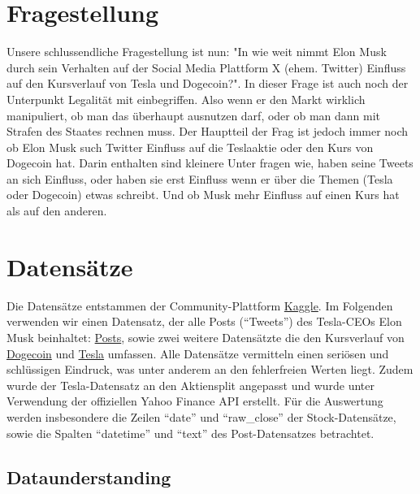 \documentclass{article}
\begin{document}
\section{Fragestellung}
Unsere schlussendliche Fragestellung ist nun: "In wie weit nimmt Elon Musk durch sein Verhalten auf der Social Media Plattform X (ehem. Twitter) Einfluss auf den Kursverlauf von Tesla und Dogecoin?". In dieser Frage ist auch noch der Unterpunkt Legalität mit einbegriffen. Also wenn er den Markt wirklich manipuliert, ob man das überhaupt ausnutzen darf, oder ob man dann mit Strafen des Staates rechnen muss. Der Hauptteil der Frag ist jedoch immer noch ob Elon Musk such Twitter Einfluss auf die Teslaaktie oder den Kurs von Dogecoin hat. Darin enthalten sind kleinere Unter fragen wie, haben seine Tweets an sich Einfluss, oder haben sie erst Einfluss wenn er über die Themen (Tesla oder Dogecoin) etwas schreibt. Und ob Musk mehr Einfluss auf einen Kurs hat als auf den anderen. 



\section{Datensätze}
Die Datensätze entstammen der Community-Plattform \href{https://www.kaggle.com/datasets/dhruvildave/dogecoin-historical-data}{Kaggle}.
Im Folgenden verwenden wir einen Datensatz, der alle Posts (``Tweets'') des Tesla-CEOs Elon Musk  beinhaltet: \href{https://www.kaggle.com/datasets/aryansingh0909/elon-musk-tweets-updated-daily}{Posts}, sowie zwei weitere Datensätzte die den Kursverlauf von \href{https://www.kaggle.com/datasets/dhruvildave/dogecoin-historical-datay}{Dogecoin} und \href{https://www.kaggle.com/datasets/dhruvildave/dogecoin-historical-datay}{Tesla} umfassen.
Alle Datensätze vermitteln einen seriösen und schlüssigen Eindruck, was unter anderem an den fehlerfreien Werten liegt.
Zudem wurde der Tesla-Datensatz an den Aktiensplit angepasst und wurde unter Verwendung der offiziellen Yahoo Finance API erstellt.
Für die Auswertung werden insbesondere die Zeilen ``date'' und ``raw\_close'' der Stock-Datensätze, sowie die Spalten ``datetime'' und ``text'' des Post-Datensatzes betrachtet.

\subsection{Dataunderstanding}
\end{document}
